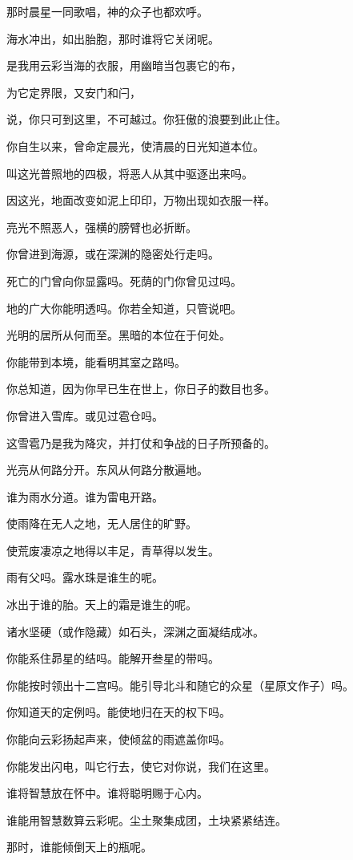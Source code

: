 \documentclass[12pt,oneside]{book}
\begin{document}
那时晨星一同歌唱，神的众子也都欢呼。

海水冲出，如出胎胞，那时谁将它关闭呢。

是我用云彩当海的衣服，用幽暗当包裹它的布，

为它定界限，又安门和闩，

说，你只可到这里，不可越过。你狂傲的浪要到此止住。

你自生以来，曾命定晨光，使清晨的日光知道本位。

叫这光普照地的四极，将恶人从其中驱逐出来吗。

因这光，地面改变如泥上印印，万物出现如衣服一样。

亮光不照恶人，强横的膀臂也必折断。

你曾进到海源，或在深渊的隐密处行走吗。

死亡的门曾向你显露吗。死荫的门你曾见过吗。

地的广大你能明透吗。你若全知道，只管说吧。

光明的居所从何而至。黑暗的本位在于何处。

你能带到本境，能看明其室之路吗。

你总知道，因为你早已生在世上，你日子的数目也多。

你曾进入雪库。或见过雹仓吗。

这雪雹乃是我为降灾，并打仗和争战的日子所预备的。

光亮从何路分开。东风从何路分散遍地。

谁为雨水分道。谁为雷电开路。

使雨降在无人之地，无人居住的旷野。

使荒废凄凉之地得以丰足，青草得以发生。

雨有父吗。露水珠是谁生的呢。

冰出于谁的胎。天上的霜是谁生的呢。

诸水坚硬（或作隐藏）如石头，深渊之面凝结成冰。

你能系住昴星的结吗。能解开叁星的带吗。

你能按时领出十二宫吗。能引导北斗和随它的众星（星原文作子）吗。

你知道天的定例吗。能使地归在天的权下吗。

你能向云彩扬起声来，使倾盆的雨遮盖你吗。

你能发出闪电，叫它行去，使它对你说，我们在这里。

谁将智慧放在怀中。谁将聪明赐于心内。

谁能用智慧数算云彩呢。尘土聚集成团，土块紧紧结连。

那时，谁能倾倒天上的瓶呢。
\end{document}
